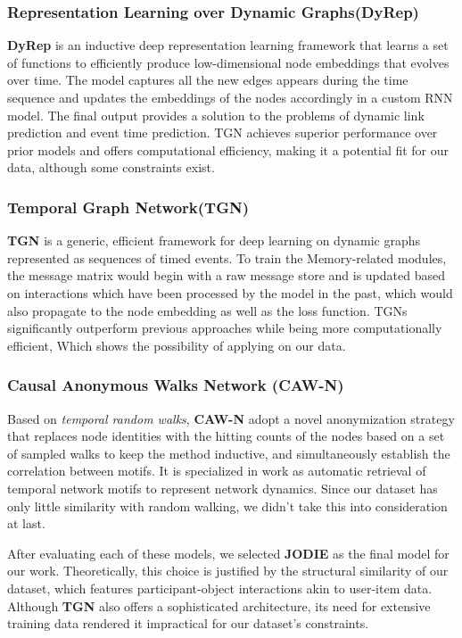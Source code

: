 \subsubsection{Representation Learning over Dynamic Graphs(DyRep)}
\textbf{DyRep}\cite{trivedi2018representation} is an inductive deep representation learning framework that learns a set of functions to efficiently produce low-dimensional node embeddings that evolves over time. The model captures all the new edges appears during the time sequence and updates the embeddings of the nodes accordingly in a custom RNN model. The final output provides a solution to the problems of dynamic link prediction and event time prediction. TGN achieves superior performance over prior models and offers computational efficiency, making it a potential fit for our data, although some constraints exist.


\subsubsection{Temporal Graph Network(TGN)}
\textbf{TGN}\cite{rossi2006temporal} is a generic, efficient framework for deep learning on dynamic graphs represented as sequences of timed events. To train the Memory-related modules, the message matrix would begin with a raw message store and is updated based on interactions which have been processed by the model in the past, which would also propagate to the node embedding as well as the loss function. TGNs significantly outperform previous approaches while being more computationally efficient, Which shows the possibility of applying on our data.

\subsubsection{Causal Anonymous Walks Network (CAW-N)}
Based on \textit{temporal random walks}, \textbf{CAW-N} adopt a novel anonymization strategy that replaces node identities with the hitting counts of the nodes based on a set of sampled walks to keep the method inductive, and simultaneously establish the correlation between motifs. It is specialized in work as automatic retrieval of temporal network motifs to represent network dynamics. Since our dataset has only little similarity with random walking, we didn't take this into consideration at last.


After evaluating each of these models, we selected \textbf{JODIE} as the final model for our work. Theoretically, this choice is justified by the structural similarity of our dataset, which features participant-object interactions akin to user-item data. Although \textbf{TGN } also offers a sophisticated architecture, its need for extensive training data rendered it impractical for our dataset's constraints. 

